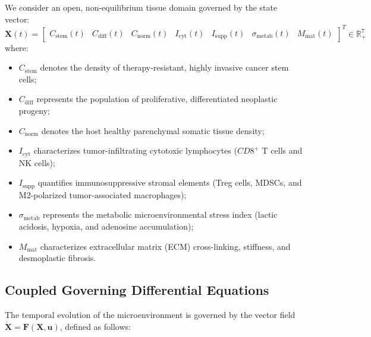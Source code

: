 \documentclass[11pt,a4paper]{article}
\begin{document}
We consider an open, non-equilibrium tissue domain governed by the state vector:
\begin{equation}
\bm{X}(t) = \begin{bmatrix} C_{\mathrm{stem}}(t) & C_{\mathrm{diff}}(t) & C_{\mathrm{norm}}(t) & I_{\mathrm{cyt}}(t) & I_{\mathrm{supp}}(t) & \sigma_{\mathrm{metab}}(t) & M_{\mathrm{mat}}(t) \end{bmatrix}^T \in \mathbb{R}_+^7
\end{equation}
where:
\begin{itemize}
    \item $C_{\mathrm{stem}}$ denotes the density of therapy-resistant, highly invasive cancer stem cells;
    \item $C_{\mathrm{diff}}$ represents the population of proliferative, differentiated neoplastic progeny;
    \item $C_{\mathrm{norm}}$ denotes the host healthy parenchymal somatic tissue density;
    \item $I_{\mathrm{cyt}}$ characterizes tumor-infiltrating cytotoxic lymphocytes ($CD8^+$ T cells and NK cells);
    \item $I_{\mathrm{supp}}$ quantifies immunosuppressive stromal elements (Treg cells, MDSCs, and M2-polarized tumor-associated macrophages);
    \item $\sigma_{\mathrm{metab}}$ represents the metabolic microenvironmental stress index (lactic acidosis, hypoxia, and adenosine accumulation);
    \item $M_{\mathrm{mat}}$ characterizes extracellular matrix (ECM) cross-linking, stiffness, and desmoplastic fibrosis.
\end{itemize}

\subsection{Coupled Governing Differential Equations}

The temporal evolution of the microenvironment is governed by the vector field $\dot{\bm{X}} = \bm{F}(\bm{X}, \bm{u})$, defined as follows:
\end{document}
